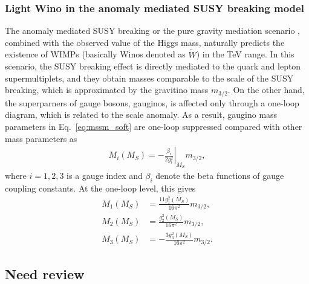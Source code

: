 \documentclass[12pt,twoside,book]{article}
\begin{document}


\subsubsection*{Light Wino in the anomaly mediated SUSY breaking model}

The anomaly mediated SUSY breaking \cite{Giudice:1998xp, Randall:1998uk} or the pure gravity mediation scenario \cite{Ibe:2006de, Ibe:2011aa, ArkaniHamed:2012gw}, combined with the observed value of the Higgs mass, naturally predicts the existence of WIMPs (basically Winos denoted as $\tilde{W}$) in the TeV range.
In this scenario, the SUSY breaking effect is directly mediated to the quark and lepton supermultiplets, and they obtain masses comparable to the scale of the SUSY breaking, which is approximated by the gravitino mass $m_{3/2}$.
On the other hand, the superparners of gauge bosons, gauginos, is affected only through a one-loop diagram, which is related to the scale anomaly.
As a result, gaugino mass parameters in Eq.~\eqref{eq:mssm_soft} are one-loop suppressed compared with other mass parameters as
\begin{align}
  M_i (M_S) = -\left. \frac{\beta_i}{2 g_i^2} \right|_{M_S} m_{3/2},
\end{align}
where $i=1,2,3$ is a gauge index and $\beta_i$ denote the beta functions of gauge coupling constants.
At the one-loop level, this gives
\begin{align}
  M_1 (M_S) &= \frac{11 g_1^2 (M_S)}{16 \pi^2} m_{3/2},\\
  M_2 (M_S) &= \frac{g_2^2 (M_S)}{16 \pi^2} m_{3/2},\\
  M_3 (M_S) &= -\frac{3 g_3^2 (M_S)}{16 \pi^2} m_{3/2}.
\end{align}


\subsection{Need review}
\end{document}
